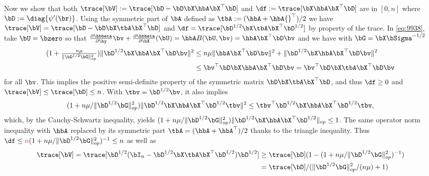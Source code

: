 \documentclass{colt2022} %
\newcommand{\pb}[1]{{\color{magenta} #1}}
\renewenvironment{proof}[1][]
{
    \begin{newproof}
    \ifthenelse{\equal{#1}{}}{ }{\textbf{(#1) }}%
}{
    \end{newproof}
}
\numberwithin{equation}{section}
\begin{document}
\begin{proof}
    Now we show that both $\trace[\bV] := \trace[\bD - \bD \bX \hbA \bX^{\top} \bD ]$ and $\df := \trace [ \bX \hbA \bX^{\top} \bD ]$ are in $[0,n]$ where $\bD := \diag \{ \psi'  ( \br ) \}$.
    Using the symmetric part of $\bA$ defined as
    $\tbA := ( \hbA + \hbA{}^{\top}) / 2$ we have
    $ 
        \trace [ \bV ] = \trace [ \bD - \bD \bX \tbA \bX^{\top} \bD ]
    $
    and 
    $ 
        \df = \trace [ \bD^{1/2} \bX \tbA \bX^{\top} \bD^{1/2}]
    $ by property of the trace.
    In \eqref{eq:9938}, take
    $\bU = \bzero $ so that
    $ 
        \frac{ \partial \hbbeta }{ \partial \by } \bv + \frac{ \partial \hbbeta }{ \partial \bX } (\bU) = \hbA B( \bU,\bv )
        =
        \hbA \bX^{\top} \bD \bv
    $
    and we have with $\bG=\bX\bSigma^{-1/2}$
    \begin{align} 
        (1 + \tfrac{n \mu}{\|\bD^{1/2}\bG\|_{op}^2})
        \|\bD^{1/2}\bX \hbA \bX^{\top} \bD \bv \|^{2}
        &\le
        n \mu \| \hbA \bX^{\top} \bD \bv \|^{2}
        +
        \| \bD^{1/2} \bX \hbA \bX^{\top} \bD \bv \|^{2}
        \\
        &\leq 
        \bv ^{\top} \bD \bX \hbA \bX^{\top} \bD \bv
        =
        \bv ^{\top} \bD \bX \tbA \bX^{\top} \bD \bv
        \label{eq:forallv}
    \end{align}
    for all $\bv$.
    This implies the positive semi-definite property of the symmetric matrix $\bD \bX \tbA \bX^{\top} \bD$, 
    and thus $\df \geq 0$ and $\trace [ \bV ] \leq \trace [ \bD ] \leq n$.
    With $\tbv = \bD^{1/2} \bv$, it also implies
    $$ 
        (1 + n \mu / \|\bD^{1/2}\bG\|_{op}^2)
        \| \bD ^{1/2} \bX \hbA \bX^{\top} \bD^{1/2} \tbv \|^{2}
        \leq 
        \tbv ^{\top} \bD^{1/2} \bX  \hbA \bX^{\top} \bD^{1/2} \tbv,
    $$
    which, by the Cauchy-Schwartz inequality, yields
    $
    (1 + n \mu / \|\bD^{1/2}\bG\|_{op}^2)
    \| \bD^{1/2} \bX \hbA \bX^{\top} \bD^{1/2} \|_{op} \leq 1$.
    The same operator norm inequality with $\hbA$ replaced by
    its symmetric part $\tbA=(\hbA+\hbA^\top)/2$
    thanks to the triangle inequality.
    Thus
    $\df \le
        \pb{n}
        (1 + n \mu / \|\bD^{1/2}\bG\|_{op}^2)^{-1}
    \le n$ as well as
    \begin{align}
    \trace[\bV]
            =\trace[\bD^{1/2}(\bI_n - \bD^{1/2}\bX\tbA\bX^\top\bD^{1/2})\bD^{1/2}]
        \nonumber
          &\ge \trace[\bD](1-
          (1 + n \mu / \|\bD^{1/2}\bG\|_{op}^2)^{-1}
            )
        \nonumber
          \\&= \trace[\bD]/(\|\bD^{1/2}\bG\|_{op}^2/(n\mu) + 1)

\end{align}
\end{proof}
\end{document}
